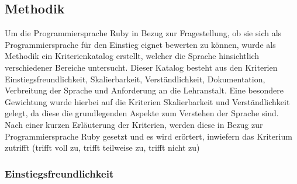 \documentclass[12pt,DIV=14, version=first, BCOR=10mm,a4paper,twoside,parskip=half-,headsepline,headinclude]{scrartcl}
\begin{document}
\subsection{Methodik}
\begin{flushleft}
Um die Programmiersprache Ruby in Bezug zur Fragestellung, ob sie sich als Programmiersprache für den Einstieg eignet bewerten zu können, wurde als Methodik ein Kriterienkatalog erstellt, welcher die Sprache hinsichtlich verschiedener Bereiche untersucht. Dieser Katalog besteht aus den Kriterien Einstiegsfreundlichkeit, Skalierbarkeit, Verständlichkeit, Dokumentation, Verbreitung der Sprache und Anforderung an die Lehranstalt. Eine besondere Gewichtung wurde hierbei auf die Kriterien Skalierbarkeit und Verständlichkeit gelegt, da diese die grundlegenden Aspekte zum Verstehen der Sprache sind. Nach einer kurzen Erläuterung der Kriterien, werden diese in Bezug zur Programmiersprache Ruby gesetzt und es wird erörtert, inwiefern das Kriterium zutrifft (trifft voll zu, trifft teilweise zu, trifft nicht zu)
\end{flushleft}

\subsubsection{Einstiegsfreundlichkeit}
\end{document}
